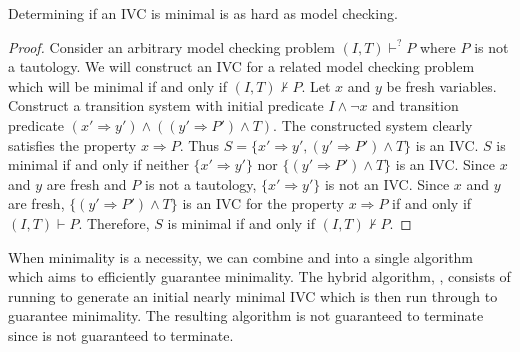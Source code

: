 \begin{theorem}
\label{thm:minimal-hard}
Determining if an IVC is minimal is as hard as model checking.
\end{theorem}
\begin{proof}
Consider an arbitrary model checking problem $(I, T)\vdash^? P$ where
$P$ is not a tautology. We will construct an IVC for a related model
checking problem which will be minimal if and only if $(I, T)\nvdash
P$. Let $x$ and $y$ be fresh variables. Construct a transition system
with initial predicate $I\land \neg x$ and transition predicate $(x'
\Rightarrow y') \land ((y' \Rightarrow P') \land T)$. The constructed
system clearly satisfies the property $x \Rightarrow P$. Thus $S = \{x'
\Rightarrow y', (y' \Rightarrow P') \land T\}$ is an IVC. $S$ is
minimal if and only if neither $\{x' \Rightarrow y'\}$ nor $\{(y'
\Rightarrow P') \land T\}$ is an IVC. Since $x$ and $y$ are fresh and
$P$ is not a tautology, $\{x' \Rightarrow y'\}$ is not an IVC. Since
$x$ and $y$ are fresh, $\{(y' \Rightarrow P') \land T\}$ is an IVC for
the property $x \Rightarrow P$ if and only if $(I, T)\vdash P$.
Therefore, $S$ is minimal if and only if $(I, T)\nvdash P$.
\end{proof}

When minimality is a necessity, we can combine \bfalg and \ucalg into
a single algorithm which aims to efficiently guarantee minimality. The
hybrid algorithm, \ucbfalg, consists of running \ucalg to generate an
initial nearly minimal IVC which is then run through \bfalg to
guarantee minimality. The resulting algorithm is not guaranteed to
terminate since \bfalg is not guaranteed to terminate.


